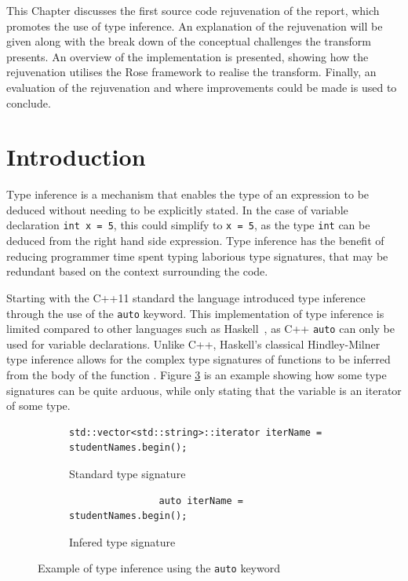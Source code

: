 \documentclass[bsc,frontabs,singlespacing,twoside,parskip,deptreport]{infthesis}
\begin{document}
This Chapter discusses the first source code rejuvenation of the report, which promotes the use of type inference. An explanation of the rejuvenation will be given along with the break down of the conceptual challenges the transform presents. An overview of the implementation is presented, showing how the rejuvenation utilises the Rose framework to realise the transform. Finally, an evaluation of the rejuvenation and where improvements could be made is used to conclude.

\section{Introduction}

Type inference is a mechanism that enables the type of an expression to be deduced without needing to be explicitly stated. In the case of variable declaration \texttt{int x = 5}, this could simplify to \texttt{x = 5}, as the type \texttt{int} can be deduced from the right hand side expression. Type inference has the benefit of reducing programmer time spent typing laborious type signatures, that may be redundant based on the context surrounding the code. 


Starting with the C++11 standard the language introduced type inference through the use of the \texttt{auto} keyword. This implementation of type inference is limited compared to other languages such as Haskell~\cite{LYAHFGG_Lipovaca}, as C++ \texttt{auto} can only be used for variable declarations. Unlike C++, Haskell's classical Hindley-Milner type inference allows for the complex type signatures of functions to be inferred from the body of the function \cite{HASK_TYPE_INF}. Figure \ref{fig:auto-type} is an example  showing  how some type signatures can be quite arduous, while only stating that the variable is an iterator of some type.

\begin{figure}[!h]
    \centering
    \begin{subfigure}[h]{\textwidth}
        \centering
        \begin{verbatim}
std::vector<std::string>::iterator iterName = studentNames.begin();
        \end{verbatim}
        \caption{Standard type signature}
        \label{fig:auto-type-before}
    \end{subfigure}
    \begin{subfigure}[h]{\textwidth}
        \centering
        \vspace{0.2cm}
        \begin{verbatim}
                auto iterName = studentNames.begin(); 
        \end{verbatim}
        \caption{Infered type signature}
        \label{fig:auto-type-after}
    \end{subfigure}
    \caption{Example of type inference using the \texttt{auto} keyword}
    \label{fig:auto-type}
\end{figure}
\end{document}
